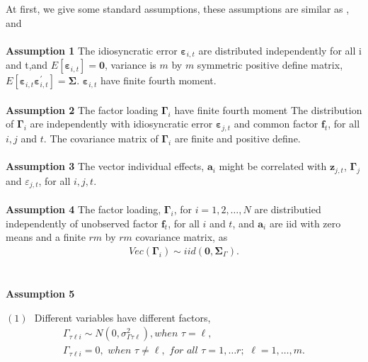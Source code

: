 \documentclass[12pt,a4paper,hyperref]{article}
\begin{document}
At first, we give some standard assumptions, these assumptions are similar as \citet{Hsiao:2002}, \citet{Binder:2005} and \citet{Hayakawa:2018}\\ \\
 \textbf{Assumption 1}  The idiosyncratic error $\boldsymbol{\varepsilon}_{i,t}$ are distributed independently for all i and t,and $E \left[\boldsymbol{\varepsilon}_{i,t}  \right]=\boldsymbol{0}$, variance is $m$ by $m$ symmetric positive define matrix, $E\left[\boldsymbol{\varepsilon}_{i,t} \boldsymbol{\varepsilon}^{'}_{i,t} \right]=\boldsymbol{\Sigma} $.  $\boldsymbol{\varepsilon}_{i,t}$ have finite fourth moment. \\ \\

 \textbf{Assumption 2 } The factor loading $\boldsymbol{\Gamma}_{i}$ have finite fourth moment
The distribution of $\boldsymbol{\Gamma}_{i}$ are independently with idiosyncratic error $\boldsymbol{\varepsilon}_{j,t}$ and common factor $\boldsymbol{f}_{t}$, for all $i, j$ and $t$.
The covariance matrix of $\boldsymbol{\Gamma}_{i}$ are finite and positive define.  \\ \\
\textbf{Assumption 3}
The vector individual effects, $\boldsymbol{a}_{i}$ might be correlated with $\boldsymbol{z}_{j,t}$, $\boldsymbol{\Gamma}_{j}$ and $\varepsilon_{j,t}$, for all $i, j, t$.
\\ \\
\textbf{Assumption 4}
The factor loading, $\boldsymbol{\Gamma}_{i}$, for $i=1,2,\ldots,N$ are distributied independently of unobserved factor $\boldsymbol{f}_{t}$, for all $i$ and $t$, and $\boldsymbol{a}_{i}$ are iid with zero means and a finite  $rm$ by $rm$  covariance matrix, as
\begin{align}
Vec(\boldsymbol{\Gamma}_{i})\sim iid \left(\boldsymbol{0}, \boldsymbol{\Sigma}_{\Gamma} \right).
\end{align}
\\ \\
\textbf{Assumption 5}

$(1)$ \,\,Different variables have different factors,
\begin{align*}
\Gamma_{\tau \ell i}\sim N\left(0,\sigma^{2}_{\Gamma \tau \ell}  \right), when\,\,\tau = \ell , \\
\Gamma_{\tau \ell i}=0 ,\,\, when\,\,\tau \neq \ell, \,\, for \,\, all \,\,\tau=1,\ldots r ;\,\, \ell=1,\ldots, m.
\end{align*}
\end{document}
